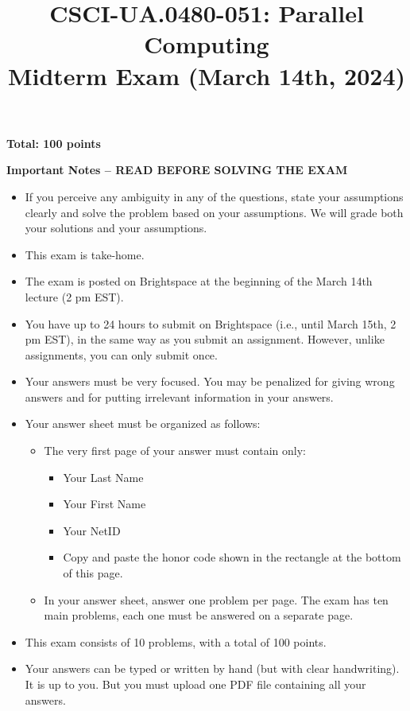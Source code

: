 \documentclass{article}
\begin{document}
\title{CSCI-UA.0480-051: Parallel Computing \\ Midterm Exam (March 14th, 2024)}
\author{}
\date{}
\maketitle

\textbf{Total: 100 points}

\textbf{Important Notes -- READ BEFORE SOLVING THE EXAM}

\begin{itemize}
    \item If you perceive any ambiguity in any of the questions, state your assumptions clearly and solve the problem based on your assumptions. We will grade both your solutions and your assumptions.
    \item This exam is take-home.
    \item The exam is posted on Brightspace at the beginning of the March 14th lecture (2 pm EST).
    \item You have up to 24 hours to submit on Brightspace (i.e., until March 15th, 2 pm EST), in the same way as you submit an assignment. However, unlike assignments, you can only submit once.
    \item Your answers must be very focused. You may be penalized for giving wrong answers and for putting irrelevant information in your answers.
    \item Your answer sheet must be organized as follows:
    \begin{itemize}
        \item The very first page of your answer must contain only:
        \begin{itemize}
            \item Your Last Name
            \item Your First Name
            \item Your NetID
            \item Copy and paste the honor code shown in the rectangle at the bottom of this page.
        \end{itemize}
        \item In your answer sheet, answer one problem per page. The exam has ten main problems, each one must be answered on a separate page.
    \end{itemize}
    \item This exam consists of 10 problems, with a total of 100 points.
    \item Your answers can be typed or written by hand (but with clear handwriting). It is up to you. But you must upload one PDF file containing all your answers.
\end{itemize}
\end{document}
